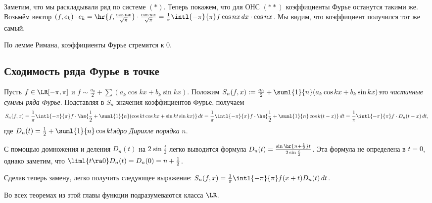 \documentclass[a4paper]{article}
\newcommand{\intlpp}{\intl{-\pi}{\pi}}
\newcommand{\frpi}{\frac{1}{\pi}}
\begin{document}
Заметим, что мы раскладывали ряд по системе $(*)$. Теперь покажем, что для ОНС $(**)$ коэффициенты
Фурье останутся такими же. Возьмём вектор $(f,e_k) \cdot e_k = \hr{f, \frac{\cos
nx}{\sqrt{\pi}}}\cdot \frac{\cos nx}{\sqrt{\pi}} = \frpi \intlpp f \cos nx \,d x \cdot \cos nx$.
Мы видим, что коэффициент получился тот же самый.

\begin{note}
По лемме Римана, коэффициенты Фурье стремятся к 0.
\end{note}

\subsection{Сходимость ряда Фурье в точке}

Пусть $f \in\LR[-\pi,\pi]$ и $f \sim \frac{a_0}{2} + \sum (a_k \cos kx + b_k \sin kx)$. Положим
$S_n(f,x) := \frac{a_0}{2} + \suml{1}{n}(a_k \cos kx + b_k \sin kx)$\т это \emph{частичные суммы
ряда Фурье}. Подставляя в $S_n$ значения коэффициентов Фурье, получаем
$$S_n(f,x) = \frpi \intlpp
f\cdot\hs{\frac{1}{2} + \suml{1}{n}(\cos kt \cos kx + \sin kt \sin kx)} \,d t= \frpi \intlpp
f\cdot\hs{\frac{1}{2} + \suml{1}{n}\cos k(t-x)}\,d t = \frpi \intlpp f \cdot D_n(t-x) \,d t,$$
где $D_n(t) = \frac{1}{2} + \suml{1}{n}\cos kt$\т \emph{ядро Дирихле порядка} $n$.

С помощью домножения и деления $D_n(t)$ на $2\sin \frac{t}{2}$ легко выводится формула $D_n(t) = \frac{\sin\hr{n + \frac{1}{2}}t}{2\sin \frac{t}{2}}$.
Эта формула не определена в $t = 0$, однако заметим, что $\liml{t \ra 0} D_n(t) = D_n(0) = n + \frac{1}{2}$.

Сделав теперь замену, легко получить следующее выражение: $S_n(f,x) = \frpi \intlpp
f(x+t)D_n(t)\,d t$.

\begin{note}
Во всех теоремах из этой главы функции подразумеваются класса $\LR$.
\end{note}
\end{document}
